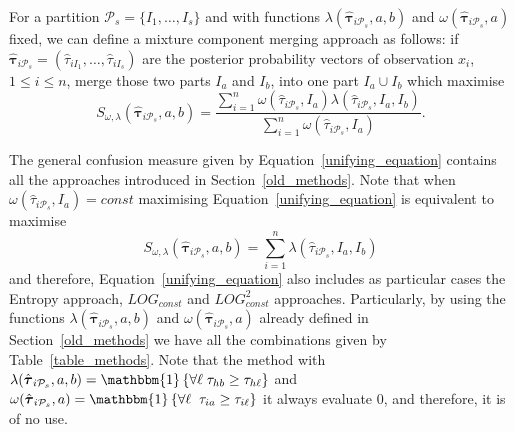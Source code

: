\documentclass[10pt, a4paper]{article}
\newcommand{\m}[1]{\boldsymbol{#1}}
\begin{document}
\begin{spacing}{1.9}
For a partition $\mathcal{P}_s = \{ I_1, \dots, I_s\}$ and with  functions $\lambda(\hat{\m \tau}_{i \mathcal{P}_s}, a, b)$ and $\omega(\hat{\m \tau}_{i \mathcal{P}_s}, a)$ fixed, we can define a mixture component merging approach as follows: if $\hat{\m\tau}_{i \mathcal{P}_s} = \left( \hat{\tau}_{i I_1} , \dots, \hat{\tau}_{i I_s}  \right)$ are the posterior probability vectors of observation $x_i$, $1 \leq i \leq n$,  merge those two parts $I_a$ and $I_b$, into one part $I_a \cup I_b$ which maximise
\begin{equation}\label{unifying_equation}
S_{\omega, \lambda}( \hat{\m \tau}_{i \mathcal{P}_s}, a, b) = \frac{\sum_{i=1}^n \omega(\hat{\tau}_{i \mathcal{P}_s}, I_a) \lambda(\hat{\tau}_{i \mathcal{P}_s}, I_a, I_b)}{\sum_{i=1}^n \omega(\hat{\tau}_{i \mathcal{P}_s}, I_a) }.
\end{equation}


The general confusion measure given by Equation~\ref{unifying_equation} contains all the approaches introduced in Section~\ref{old_methods}. Note that when $\omega(\hat{\tau}_{i \mathcal{P}_s}, I_a) = const$ maximising Equation~\ref{unifying_equation} is equivalent to maximise
\[
S_{\omega, \lambda}( \hat{\m \tau}_{i \mathcal{P}_s}, a, b) = \sum_{i=1}^n \lambda(\hat{\tau}_{i \mathcal{P}_s}, I_a, I_b)
\]
and therefore, Equation~\ref{unifying_equation} also includes as particular cases the Entropy approach, $LOG_{const}$ and $LOG^2_{const}$ approaches. Particularly, by using the functions $\lambda(\hat{\m \tau}_{i \mathcal{P}_s}, a, b)$ and $\omega(\hat{\m \tau}_{i \mathcal{P}_s}, a)$ already defined in Section~\ref{old_methods} we have all the combinations given by Table~\ref{table_methods}. Note that the method with $\lambda(\hat{\m \tau}_{i \mathcal{P}_s}, a, b) =  \mathlarger{\mathbbm{1}}\left\{  \forall \ell \; \tau_{hb} \geq \tau_{h\ell}  \right\}$ and  $\omega(\hat{\m \tau}_{i \mathcal{P}_s}, a) = \mathlarger{\mathbbm{1}}\left\{  \forall \ell\; \; \tau_{ia} \geq \tau_{i\ell}  \right\}$ it always evaluate 0, and therefore, it is of no use.


\end{spacing}
\end{document}
